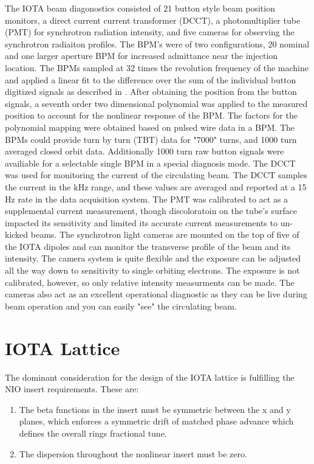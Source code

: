 The IOTA beam diagonostics consisted of 21 button style beam position monitors, a direct current current transformer (DCCT), a photomultiplier tube (PMT) for synchrotron radiation intensity, and five cameras for observing the synchrotron radiaiton profiles. The BPM's were of two configurations, 20 nominal and one larger aperture BPM for increased admittance near the injection location. The BPMs sampled at 32 times the revolution frequency of the machine and applied a linear fit to the difference over the sum of the individual button digitized signals as described in \cite{linearBPM}. After obtaining the position from the button signals, a seventh order two dimensional polynomial was applied to the measured position to account for the nonlinear response of the BPM. The factors for the polynomial mapping were obtained based on pulsed wire data in a BPM. The BPMs could provide turn by turn (TBT) data for "7000" turns, and 1000 turn averaged closed orbit data. Additionally 1000 turn raw button signals were availiable for a selectable single BPM in a special diagnosis mode. The DCCT was used for monitoring the current of the circulating beam. The DCCT samples the current in the kHz range, and these values are averaged and reported at a 15 Hz rate in the data acquisition system. The PMT was calibrated to act as a supplemental current measurement, though discoloratoin on the tube's surface impacted its sensitivity and limited its accurate current measurements to un-kicked beams. The synchrotron light cameras are mounted on the top of five of the IOTA dipoles and can monitor the transverse profile of the beam and its intensity. The camera system is quite flexible and the exposure can be adjusted all the way down to sensitivity to single orbiting electrons. The exposure is not calibrated, however, so only relative intensity measurments can be made. The cameras also act as an excellent operational diagnostic as they can be live during beam operation and you can easily "see" the circulating beam.

\section{IOTA Lattice}
The dominant consideration for the design of the IOTA lattice is fulfilling the NIO insert requirements. These are:

\begin{enumerate}
	\item The beta functions in the insert must be symmetric between the x and y planes, which enforces a symmetric drift of matched phase advance which defines the overall rings fractional tune.
	\item The dispersion throughout the nonlinear insert must be zero.
\end{enumerate}

